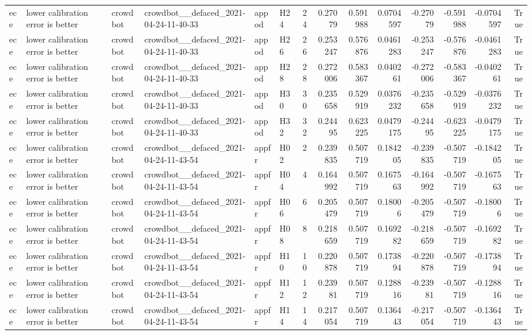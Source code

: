 \begin{longtable}{llllllrrrrrrrr}
ece & lower calibration error is better & crowdbot & crowdbot\_\_defaced\_2021-04-24-11-40-33 & appod & H24 & 24 & 0.27079 & 0.591988 & 0.0704597 & -0.27079 & -0.591988 & -0.0704597 & True \\
ece & lower calibration error is better & crowdbot & crowdbot\_\_defaced\_2021-04-24-11-40-33 & appod & H26 & 26 & 0.253247 & 0.576876 & 0.0461283 & -0.253247 & -0.576876 & -0.0461283 & True \\
ece & lower calibration error is better & crowdbot & crowdbot\_\_defaced\_2021-04-24-11-40-33 & appod & H28 & 28 & 0.272006 & 0.583367 & 0.040261 & -0.272006 & -0.583367 & -0.040261 & True \\
ece & lower calibration error is better & crowdbot & crowdbot\_\_defaced\_2021-04-24-11-40-33 & appod & H30 & 30 & 0.235658 & 0.529919 & 0.0376232 & -0.235658 & -0.529919 & -0.0376232 & True \\
ece & lower calibration error is better & crowdbot & crowdbot\_\_defaced\_2021-04-24-11-40-33 & appod & H32 & 32 & 0.24495 & 0.623225 & 0.0479175 & -0.24495 & -0.623225 & -0.0479175 & True \\
ece & lower calibration error is better & crowdbot & crowdbot\_\_defaced\_2021-04-24-11-43-54 & appfr & H02 & 2 & 0.239835 & 0.507719 & 0.184205 & -0.239835 & -0.507719 & -0.184205 & True \\
ece & lower calibration error is better & crowdbot & crowdbot\_\_defaced\_2021-04-24-11-43-54 & appfr & H04 & 4 & 0.164992 & 0.507719 & 0.167563 & -0.164992 & -0.507719 & -0.167563 & True \\
ece & lower calibration error is better & crowdbot & crowdbot\_\_defaced\_2021-04-24-11-43-54 & appfr & H06 & 6 & 0.205479 & 0.507719 & 0.18006 & -0.205479 & -0.507719 & -0.18006 & True \\
ece & lower calibration error is better & crowdbot & crowdbot\_\_defaced\_2021-04-24-11-43-54 & appfr & H08 & 8 & 0.218659 & 0.507719 & 0.169282 & -0.218659 & -0.507719 & -0.169282 & True \\
ece & lower calibration error is better & crowdbot & crowdbot\_\_defaced\_2021-04-24-11-43-54 & appfr & H10 & 10 & 0.220878 & 0.507719 & 0.173894 & -0.220878 & -0.507719 & -0.173894 & True \\
ece & lower calibration error is better & crowdbot & crowdbot\_\_defaced\_2021-04-24-11-43-54 & appfr & H12 & 12 & 0.23981 & 0.507719 & 0.128816 & -0.23981 & -0.507719 & -0.128816 & True \\
ece & lower calibration error is better & crowdbot & crowdbot\_\_defaced\_2021-04-24-11-43-54 & appfr & H14 & 14 & 0.217054 & 0.507719 & 0.136443 & -0.217054 & -0.507719 & -0.136443 & True \\

\end{longtable}

